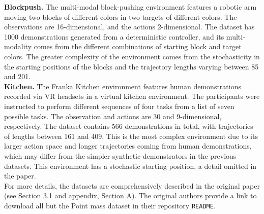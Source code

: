 \textbf{Blockpush.}
The multi-modal block-pushing environment \cite{florence_implicit_2021} features a robotic arm moving two blocks of different colors in two targets of different colors.
The observations are 16-dimensional, and the actions 2-dimensional.
The dataset has 1000 demonstrations generated from a deterministic controller, and its multi-modality comes from the different combinations of starting block and target colors.
The greater complexity of the environment comes from the stochasticity in the starting positions of the blocks and the trajectory lengths varying between 85 and 201.\\

\textbf{Kitchen.}
The Franka Kitchen environment \cite{gupta_relay_2019} features human demonstrations recorded via VR headsets in a virtual kitchen environment.
The participants were instructed to perform different sequences of four tasks from a list of seven possible tasks.
The observation and actions are 30 and 9-dimensional, respectively.
The dataset contains 566 demonstrations in total, with trajectories of lengths between 161 and 409.
This is the most complex environment due to its larger action space and longer trajectories coming from human demonstrations, which may differ from the simpler synthetic demonstrators in the previous datasets.
This environment has a stochastic starting position, a detail omitted in the paper.\\

For more details, the datasets are comprehensively described in the original paper \cite{shafiullah2022behavior} (see Section 3.1 and appendix, Section A).
The original authors provide a link to download all but the Point mass dataset in their repository \texttt{README}. 
